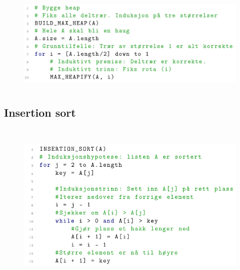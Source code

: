 \documentclass[12pt]{report}
\begin{document}

\par


\vspace{\baselineskip}



\begin{figure}[H]
	\begin{Center}
		\includegraphics[width=5.05in,height=1.86in]{./media/image172.png}
	\end{Center}
\end{figure}



\par


\vspace{\baselineskip}

\vspace{\baselineskip}\subsection*{Insertion sort}



\begin{figure}[H]
	\begin{Center}
		\includegraphics[width=5.49in,height=3.17in]{./media/image173.png}
	\end{Center}
\end{figure}
\end{document}

